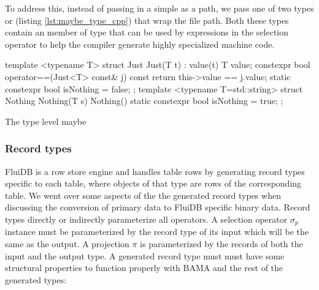 To address this, instead of passing in a simple  as a
path, we pass one of two types  or  (listing
\ref{lst:maybe_type_cpp}) that wrap the file path. Both these types
contain an  member of  type that can be used by
 expressions in the selection operator to help
the compiler generate highly specialized machine code.

\begin{code}
\begin{cppcode}
template <typename T>
struct Just {
  Just(T t) : value(t) {}
  T value;
  constexpr bool operator==(Just<T> const& j) const {
    return this->value == j.value;
  }
  static constexpr bool isNothing = false;
};
template <typename T=std::string>
struct Nothing {
  Nothing(T s) {}
  Nothing() {}
  static constexpr bool isNothing = true;
};
\end{cppcode}
\caption{\label{lst:maybe_type_cpp}The type level maybe}
\end{code}

\subsubsection{Record types}

FluiDB is a row store engine and handles table rows by generating
record types specific to each table, where objects of that type are
rows of the corresponding table. We went over some aspects of the the
generated record types when discussing the conversion of primary data
to FluiDB specific binary data. Record types directly or indirectly
parameterize all operators. A selection operator \(\sigma_p\) instance
must be parameterized by the record type of its input which will be
the same as the output. A projection \(\pi\) is parameterized by the
records of both the input and the output type. A generated record type
must must have some structural properties to function properly with
BAMA and the rest of the generated types:

